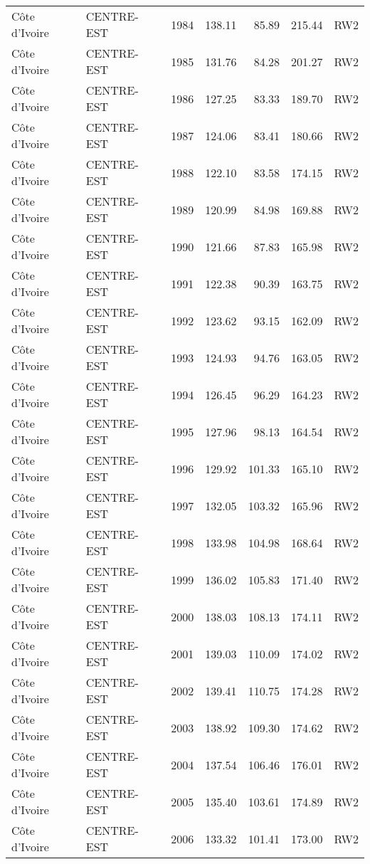 \begin{longtable}{lllrrrl}
  C\^{o}te d'Ivoire & CENTRE-EST & 1984 & 138.11 & 85.89 & 215.44 & RW2 \\ 
  C\^{o}te d'Ivoire & CENTRE-EST & 1985 & 131.76 & 84.28 & 201.27 & RW2 \\ 
  C\^{o}te d'Ivoire & CENTRE-EST & 1986 & 127.25 & 83.33 & 189.70 & RW2 \\ 
  C\^{o}te d'Ivoire & CENTRE-EST & 1987 & 124.06 & 83.41 & 180.66 & RW2 \\ 
  C\^{o}te d'Ivoire & CENTRE-EST & 1988 & 122.10 & 83.58 & 174.15 & RW2 \\ 
  C\^{o}te d'Ivoire & CENTRE-EST & 1989 & 120.99 & 84.98 & 169.88 & RW2 \\ 
  C\^{o}te d'Ivoire & CENTRE-EST & 1990 & 121.66 & 87.83 & 165.98 & RW2 \\ 
  C\^{o}te d'Ivoire & CENTRE-EST & 1991 & 122.38 & 90.39 & 163.75 & RW2 \\ 
  C\^{o}te d'Ivoire & CENTRE-EST & 1992 & 123.62 & 93.15 & 162.09 & RW2 \\ 
  C\^{o}te d'Ivoire & CENTRE-EST & 1993 & 124.93 & 94.76 & 163.05 & RW2 \\ 
  C\^{o}te d'Ivoire & CENTRE-EST & 1994 & 126.45 & 96.29 & 164.23 & RW2 \\ 
  C\^{o}te d'Ivoire & CENTRE-EST & 1995 & 127.96 & 98.13 & 164.54 & RW2 \\ 
  C\^{o}te d'Ivoire & CENTRE-EST & 1996 & 129.92 & 101.33 & 165.10 & RW2 \\ 
  C\^{o}te d'Ivoire & CENTRE-EST & 1997 & 132.05 & 103.32 & 165.96 & RW2 \\ 
  C\^{o}te d'Ivoire & CENTRE-EST & 1998 & 133.98 & 104.98 & 168.64 & RW2 \\ 
  C\^{o}te d'Ivoire & CENTRE-EST & 1999 & 136.02 & 105.83 & 171.40 & RW2 \\ 
  C\^{o}te d'Ivoire & CENTRE-EST & 2000 & 138.03 & 108.13 & 174.11 & RW2 \\ 
  C\^{o}te d'Ivoire & CENTRE-EST & 2001 & 139.03 & 110.09 & 174.02 & RW2 \\ 
  C\^{o}te d'Ivoire & CENTRE-EST & 2002 & 139.41 & 110.75 & 174.28 & RW2 \\ 
  C\^{o}te d'Ivoire & CENTRE-EST & 2003 & 138.92 & 109.30 & 174.62 & RW2 \\ 
  C\^{o}te d'Ivoire & CENTRE-EST & 2004 & 137.54 & 106.46 & 176.01 & RW2 \\ 
  C\^{o}te d'Ivoire & CENTRE-EST & 2005 & 135.40 & 103.61 & 174.89 & RW2 \\ 
  C\^{o}te d'Ivoire & CENTRE-EST & 2006 & 133.32 & 101.41 & 173.00 & RW2 \\ 

\end{longtable}
